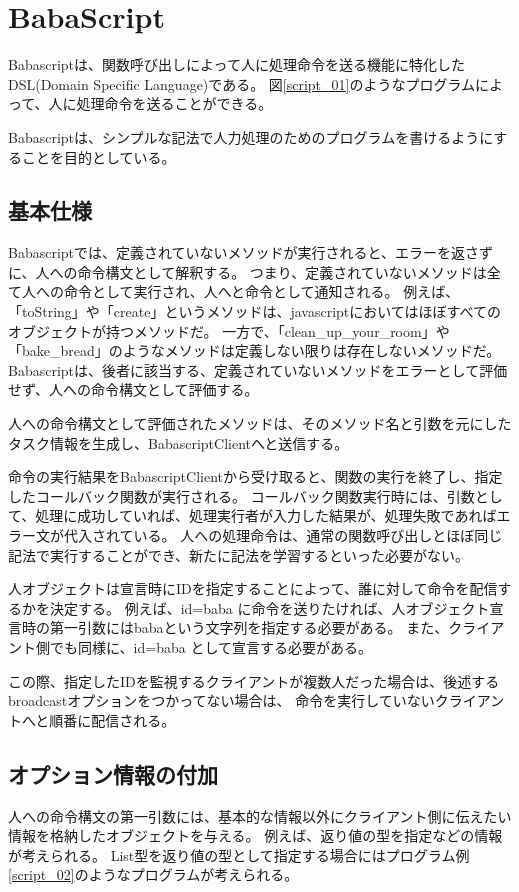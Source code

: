 \documentclass[twoside]{wiss}
\begin{document}
\section{BabaScript}

Babascriptは、関数呼び出しによって人に処理命令を送る機能に特化したDSL(Domain Specific Language)である。
図\ref{script_01}のようなプログラムによって、人に処理命令を送ることができる。

Babascriptは、シンプルな記法で人力処理のためのプログラムを書けるようにすることを目的としている。

\subsection{基本仕様}

Babascriptでは、定義されていないメソッドが実行されると、エラーを返さずに、人への命令構文として解釈する。
つまり、定義されていないメソッドは全て人への命令として実行され、人へと命令として通知される。
例えば、「toString」や「create」というメソッドは、javascriptにおいてはほぼすべてのオブジェクトが持つメソッドだ。
一方で、「clean\_up\_your\_room」や「bake\_bread」のようなメソッドは定義しない限りは存在しないメソッドだ。
Babascriptは、後者に該当する、定義されていないメソッドをエラーとして評価せず、人への命令構文として評価する。

人への命令構文として評価されたメソッドは、そのメソッド名と引数を元にしたタスク情報を生成し、BabascriptClientへと送信する。

命令の実行結果をBabascriptClientから受け取ると、関数の実行を終了し、指定したコールバック関数が実行される。
コールバック関数実行時には、引数として、処理に成功していれば、処理実行者が入力した結果が、処理失敗であればエラー文が代入されている。
人への処理命令は、通常の関数呼び出しとほぼ同じ記法で実行することができ、新たに記法を学習するといった必要がない。

人オブジェクトは宣言時にIDを指定することによって、誰に対して命令を配信するかを決定する。
例えば、id=baba に命令を送りたければ、人オブジェクト宣言時の第一引数にはbabaという文字列を指定する必要がある。
また、クライアント側でも同様に、id=baba として宣言する必要がある。



この際、指定したIDを監視するクライアントが複数人だった場合は、後述するbroadcastオプションをつかってない場合は、
命令を実行していないクライアントへと順番に配信される。

\subsection{オプション情報の付加}
人への命令構文の第一引数には、基本的な情報以外にクライアント側に伝えたい情報を格納したオブジェクトを与える。
例えば、返り値の型を指定などの情報が考えられる。
List型を返り値の型として指定する場合にはプログラム例\ref{script_02}のようなプログラムが考えられる。
\end{document}
